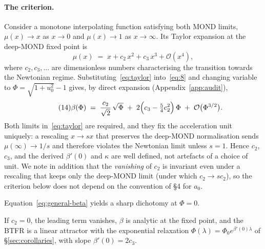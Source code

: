 \documentclass[11pt]{article}
\theoremstyle{plain}
\begin{document}
\paragraph{The criterion.}
Consider a monotone interpolating function satisfying both MOND limits,
$\mu(x)\to x$ as $x\to0$ and $\mu(x)\to1$ as $x\to\infty$. Its Taylor
expansion at the deep-MOND fixed point is
\begin{equation*}\tag{13}\label{eq:taylor}
\mu(x) \;=\; x + c_{2}\,x^{2} + c_{3}\,x^{3} + \mathcal{O}(x^{4}),
\end{equation*}
where $c_{2},c_{3},\ldots$ are dimensionless numbers characterising the
transition towards the Newtonian regime. Substituting~\eqref{eq:taylor}
into~\eqref{eq:8} and changing variable to $\Phi=\sqrt{1+u_{0}^{2}}-1$ gives,
by direct expansion (Appendix~\ref{app:audit}),
\begin{equation*}\tag{14}\label{eq:general-beta}
\beta(\Phi) \;=\; \frac{c_{2}}{\sqrt{2}}\,\sqrt{\Phi}
              \;+\; 2\Bigl(c_{3}-\tfrac{5}{4}c_{2}^{2}\Bigr)\,\Phi
              \;+\; \mathcal{O}\bigl(\Phi^{3/2}\bigr).
\end{equation*}
Both limits in~\eqref{eq:taylor} are required, and they fix the acceleration
unit uniquely: a rescaling $x\to sx$ that preserves the deep-MOND
normalisation sends $\mu(\infty)\to1/s$ and therefore violates the Newtonian
limit unless $s=1$. Hence $c_{2}$, $c_{3}$, and the derived $\beta'(0)$ and
$\kappa$ are well defined, not artefacts of a choice of unit. We note in
addition that the \emph{vanishing} of $c_{2}$ is invariant even under a
rescaling that keeps only the deep-MOND limit (under which $c_{2}\to sc_{2}$),
so the criterion below does not depend on the convention of \S4 for $a_{0}$.

Equation~\eqref{eq:general-beta} yields a sharp dichotomy at $\Phi=0$.

If $c_{2}=0$, the leading term vanishes, $\beta$ is analytic at the fixed
point, and the BTFR is a linear attractor with the exponential relaxation
$\Phi(\lambda)=\Phi_{0}e^{\beta'(0)\lambda}$ of \S\ref{sec:corollaries}, with
slope $\beta'(0)=2c_{3}$.
\end{document}
